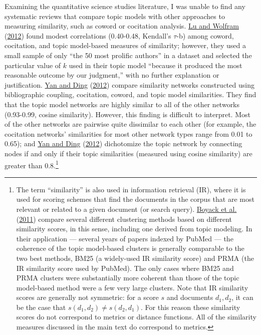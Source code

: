 \documentclass[
  11pt,
]{article}
\begin{document}
Examining the quantitative science studies literature, I was unable to find any systematic reviews that compare topic models with other approaches to measuring similarity, such as coword or cocitation analysis. \protect\hyperlink{ref-LuMeasuringAuthorResearch2012}{Lu and Wolfram} (\protect\hyperlink{ref-LuMeasuringAuthorResearch2012}{2012}) found modest correlations (0.40-0.48, Kendall's \(\tau\)-b) among coword, cocitation, and topic model-based measures of similarity; however, they used a small sample of only ``the 50 most prolific authors'' in a dataset and selected the particular value of \(k\) used in their topic model ``because it produced the most reasonable outcome by our judgment,'' with no further explanation or justification. \protect\hyperlink{ref-YanScholarlyNetworkSimilarities2012}{Yan and Ding} (\protect\hyperlink{ref-YanScholarlyNetworkSimilarities2012}{2012}) compare similarity networks constructed using bibliographic coupling, cocitation, coword, and topic model similarities. They find that the topic model networks are highly similar to all of the other networks (0.93-0.99, cosine similarity). However, this finding is difficult to interpret. Most of the other networks are pairwise quite dissimilar to each other (for example, the cocitation networks' similarities for most other network types range from 0.01 to 0.65); and \protect\hyperlink{ref-YanScholarlyNetworkSimilarities2012}{Yan and Ding} (\protect\hyperlink{ref-YanScholarlyNetworkSimilarities2012}{2012}) dichotomize the topic network by connecting nodes if and only if their topic similarities (measured using cosine similarity) are greater than 0.8.\footnote{The term ``similarity'' is also used in information retrieval (IR), where it is used for scoring schemes that find the documents in the corpus that are most relevant or related to a given document (or search query). \protect\hyperlink{ref-BoyackClusteringMoreTwo2011}{Boyack et al.} (\protect\hyperlink{ref-BoyackClusteringMoreTwo2011}{2011}) compare several different clustering methods based on different similarity scores, in this sense, including one derived from topic modeling. In their application --- several years of papers indexed by PubMed --- the coherence of the topic model-based clusters is generally comparable to the two best methods, BM25 (a widely-used IR similarity score) and PRMA (the IR similarity score used by PubMed). The only cases where BM25 and PRMA clusters were substantially more coherent than those of the topic model-based method were a few very large clusters. Note that IR similarity scores are generally not symmetric: for a score \(s\) and documents \(d_1, d_2\), it can be the case that \(s(d_1, d_2) \neq s(d_2, d_1)\). For this reason these similarity scores do not correspond to metrics or distance functions. All of the similarity measures discussed in the main text do correspond to metrics.}
\end{document}
